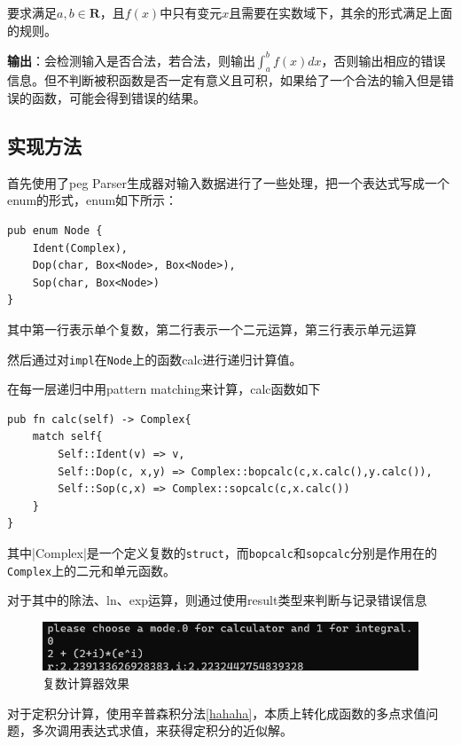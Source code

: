 \documentclass[UTF8,11pt]{ctexart}
\begin{document}
            \noindent 要求满足$a,b \in \mathbf{R}$，且$f(x)$中只有变元$x$且需要在实数域下，其余的形式满足上面的规则。

            \noindent \textbf{输出}：会检测输入是否合法，若合法，则输出$\int_{a}^{b}f(x)dx$，否则输出相应的错误信息。但不判断被积函数是否一定有意义且可积，如果给了一个合法的输入但是错误的函数，可能会得到错误的结果。

        
        \subsection*{实现方法}

            首先使用了peg Parser\cite{peg}生成器对输入数据进行了一些处理，把一个表达式写成一个enum的形式，enum如下所示：
\begin{lstlisting}
pub enum Node {
    Ident(Complex),
    Dop(char, Box<Node>, Box<Node>),
    Sop(char, Box<Node>)
}
\end{lstlisting}

其中第一行表示单个复数，第二行表示一个二元运算，第三行表示单元运算

然后通过对\lstinline|impl|在\lstinline|Node|上的函数calc进行递归计算值。

在每一层递归中用pattern matching来计算，calc函数如下
\begin{lstlisting}
pub fn calc(self) -> Complex{
    match self{
        Self::Ident(v) => v,
        Self::Dop(c, x,y) => Complex::bopcalc(c,x.calc(),y.calc()),
        Self::Sop(c,x) => Complex::sopcalc(c,x.calc())
    }
}    
\end{lstlisting}

其中|Complex|是一个定义复数的\lstinline|struct|，而\lstinline|bopcalc|和\lstinline|sopcalc|分别是作用在的\lstinline|Complex|上的二元和单元函数。

对于其中的除法、ln、exp运算，则通过使用result类型来判断与记录错误信息

\begin{figure}[!htb]
    \centering
    \includegraphics[scale=1.1]{1.png}
    \caption{复数计算器效果}
\end{figure}

对于定积分计算，使用辛普森积分法\ref{hahaha}，本质上转化成函数的多点求值问题，多次调用表达式求值，来获得定积分的近似解。
\end{document}
